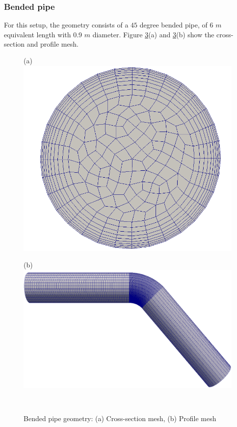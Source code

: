 \documentclass[review,3p,times,12pt]{elsarticle}
\begin{document}
\subsubsection{Bended pipe}\label{bended}
For this setup, the geometry consists of a $45$ degree bended pipe, of 6 $m$ equivalent length with 0.9 $m$ diameter. Figure \ref{bend}(a) and \ref{bend}(b) show the cross-section and profile mesh.\\
\begin{minipage}[t]{0.35\textwidth}
\begin{figure}[H]
\begin{center}
(a)\includegraphics[scale =0.09]{figs/section.png}
\label{fig:gauss}
\end{center}
\end{figure}
\end{minipage}\hfill
\begin{minipage}[t]{0.4\textwidth}
\begin{figure}[H]
(b)\includegraphics[scale = 0.17]{figs/bend.png}
\label{fig:gauss}
\end{figure}
\end{minipage}\\
\begin{figure}[H]
\centering
\caption{Bended pipe geometry: (a) Cross-section mesh, (b) Profile mesh }
\label{bend}
\end{figure}
\end{document}
